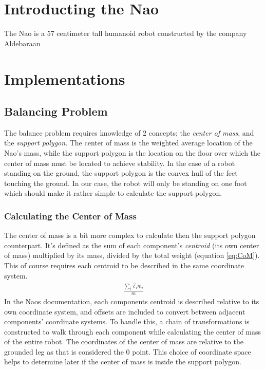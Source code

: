 \documentclass[a4paper]{article}
\begin{document}
\section{Introducting the Nao} 
The Nao is a 57 centimeter tall humanoid robot constructed by the company Aldebaraan

\section{Implementations}

\subsection{Balancing Problem}
The balance problem requires knowledge of 2 concepts; the \emph{center of mass},
and the \emph{support polygon}. The center of mass is the weighted average
location of the Nao’s mass, while the support polygon is the location on the
floor over which the center of mass must be located to achieve stability. In the
case of a robot standing on the ground, the support polygon is the convex hull
of the feet touching the ground. In our case, the robot will only be standing on
one foot which should make it rather simple to calculate the support polygon. 

\subsubsection{Calculating the Center of Mass}
The center of mass is a bit more complex to calculate then the support polygon counterpart. It's defined as the sum
of each component’s \emph{centroid} (its own center of mass) multiplied by its
mass, divided by the total weight (equation \ref{eq:CoM}). This of course
requires each centroid to be described in the same coordinate system.
\begin{align}
  \frac{\sum_i \vec{c}_i m_i} {m}        \label{eq:CoM}
\end{align}
In the Naos documentation, each components centroid is described relative to
its own coordinate system, and offsets are included to convert between adjacent
components’ coordinate systems. To handle this, a chain of
transformations is constructed to walk through each component while calculating the center of
mass of the entire robot. The coordinates of the center of mass are relative to the grounded leg as that is considered the 0 point. This choice of coordinate space helps to determine later if the center of mass is inside the support polygon.
\end{document}
